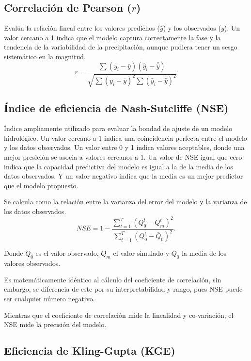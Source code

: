 \subsection{Correlación de Pearson (\(r\))}
Evalúa la relación lineal entre los valores predichos (\(\hat{y}\)) y los observados (\(y\)). Un valor cercano a 1 indica que el modelo captura correctamente la fase y la tendencia de la variabilidad de la precipitación, aunque pudiera tener un sesgo sistemático en la magnitud.
\begin{equation}
    r = \frac{\sum (y_i - \bar{y})(\hat{y}_i - \bar{\hat{y}})}{\sqrt{\sum (y_i - \bar{y})^2 \sum (\hat{y}_i - \bar{\hat{y}})^2}}
\end{equation}

\subsection{Índice de eficiencia de Nash-Sutcliffe (NSE)}
Índice ampliamente utilizado para evaluar la bondad de ajuste de un modelo hidrológico. Un valor cercano a 1 indica una coincidencia perfecta entre el modelo y los datos observados. Un valor entre 0 y 1 indica valores aceptables, donde una mejor presición se asocia a valores cercanos a 1. Un valor de NSE igual que cero indica que la capacidad predictiva del modelo es igual a la de la media de los datos observados. Y un valor negativo indica que la media es un mejor predictor que el modelo propuesto.

Se calcula como la relación entre la varianza del error del modelo y la varianza de los datos observados.
\begin{equation}
    NSE = 1 - \frac{\sum_{t=1}^T(Q_0^t-Q_m^t)^2}{\sum_{t=1}^T(Q_0^t-\bar{Q}_0)^2}.
\end{equation}

Donde $Q_0$ es el valor observado, $Q_m$ el valor simulado y $\bar{Q}_0$ la media de los valores observados. 

Es matemáticamente idéntico al cálculo del coeficiente de correlación, sin embargo, se diferencia de este por su interpretabilidad y rango, pues NSE puede ser cualquier número negativo. 

Mientras que el coeficiente de correlación mide la linealidad y co-variación, el NSE mide la precisión del modelo.

\subsection{Eficiencia de Kling-Gupta (KGE)}


